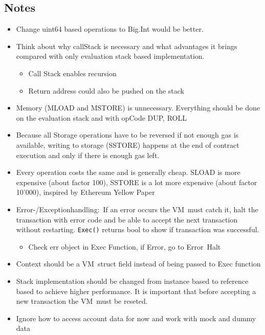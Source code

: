 \subsection{Notes}

\begin{itemize}
\item
  Change uint64 based operations to Big.Int would be better.
\item
  Think about why callStack is necessary and what advantages it brings
  compared with only evaluation stack based implementation.

  \begin{itemize}
  \item
    Call Stack enables recursion
  \item
    Return address could also be pushed on the stack
  \end{itemize}
\item
  Memory (MLOAD and MSTORE) is unnecessary. Everything should be done on
  the evaluation stack and with opCode DUP, ROLL
\item
  Because all Storage operations have to be reversed if not enough gas
  is available, writing to storage (SSTORE) happens at the end of
  contract execution and only if there is enough gas left.
\item
  Every operation costs the same and is generally cheap. SLOAD is more
  expensive (about factor 100), SSTORE is a lot more expensive (about
  factor 10'000), inspired by Ethereum Yellow Paper
\item
  Error-/Exceptionhandling:~If an error occurs the VM~must catch it,
  halt the transaction with error code and be able to accept the next
  transaction without restarting. \texttt{Exec()} returns bool to show
  if transaction was successful.

  \begin{itemize}
  \item
    Check err object in Exec Function, if Error, go to Error~Halt
  \end{itemize}
\item
  Context should be a VM~struct field instead of being passed to Exec
  function
\item
  Stack implementation should be changed from instance based to
  reference based to achieve higher performance. It is important that
  before accepting a new transaction the VM~must be reseted.
\item
  Ignore how to access account data for now and work with mock and dummy data
\end{itemize}


